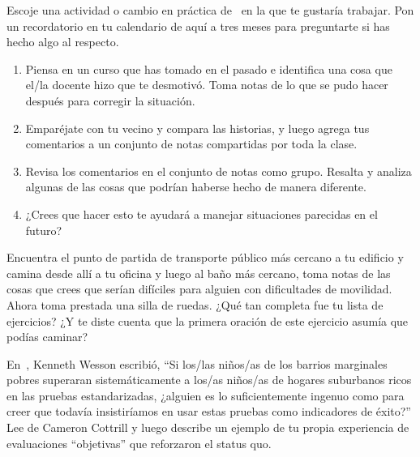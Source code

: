 
Escoje una actividad o cambio en práctica de~\cite{Lee2017} en la que te gustaría trabajar.
Pon un recordatorio en tu calendario de aquí a tres meses
para preguntarte si has hecho algo al respecto.


\begin{enumerate}
\item
  Piensa en un curso que has tomado en el pasado
  e identifica una cosa que el/la docente hizo que te desmotivó.
  Toma notas de lo que se pudo hacer después para corregir la situación.
\item
  Emparéjate con tu vecino y compara las historias,
  y luego agrega tus comentarios a un conjunto de notas compartidas por toda la clase.
\item
  Revisa los comentarios en el conjunto de notas como grupo.
  Resalta y analiza algunas de las cosas que podrían haberse hecho de manera diferente.
\item
  ¿Crees que hacer esto te ayudará a manejar situaciones parecidas en el futuro?
\end{enumerate}


Encuentra el punto de partida de transporte público más cercano a tu edificio
y camina desde allí a tu oficina y luego al baño más cercano,
toma notas de las cosas que crees que serían difíciles para alguien con dificultades de movilidad.
Ahora toma prestada una silla de ruedas.
¿Qué tan completa fue tu lista de ejercicios?
¿Y te diste cuenta que la primera oración de este ejercicio asumía que podías caminar?


En~\cite{Litt2004},
Kenneth Wesson escribió,
``Si los/las niños/as de los barrios marginales pobres superaran sistemáticamente a los/as niños/as de hogares suburbanos ricos en las pruebas estandarizadas,
¿alguien es lo suficientemente ingenuo como para creer que todavía insistiríamos en usar estas pruebas como indicadores de éxito?''
Lee 
de Cameron Cottrill
y luego describe un ejemplo de tu propia experiencia de evaluaciones ``objetivas'' que reforzaron el status quo.

